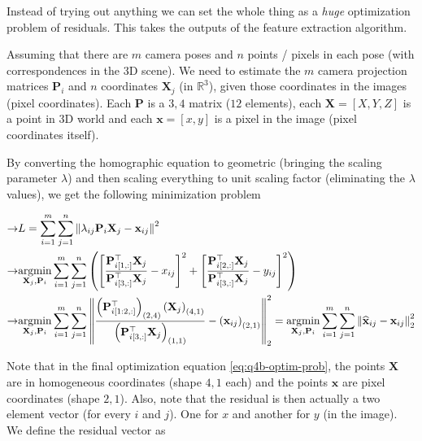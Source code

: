 Instead of trying out anything we can set the whole thing as a \textit{huge} optimization problem of residuals. This takes the outputs of the feature extraction algorithm.

Assuming that there are $m$ camera poses and $n$ points / pixels in each pose (with correspondences in the 3D scene). We need to estimate the $m$ camera projection matrices $\mathbf{P}_i$ and $n$ coordinates $\mathbf{X}_j$ (in $\mathbb{R}^3$), given those coordinates in the images (pixel coordinates). Each $\mathbf{P}$ is a $3, 4$ matrix ($12$ elements), each $\mathbf{X} = [X, Y, Z]$ is a point in 3D world and each $\mathbf{x} = [x, y]$ is a pixel in the image (pixel coordinates itself).

By converting the homographic equation to geometric (bringing the scaling parameter $\lambda$) and then scaling everything to unit scaling factor (eliminating the $\lambda$ values), we get the following minimization problem

\begin{align}
    \rightarrow& L = \sum_{i=1}^m \sum_{j=1}^{n} \left \| \lambda_{ij} \mathbf{P}_i \mathbf{X}_j - \mathbf{x}_{ij} \right \|^2
    \nonumber \\
    \rightarrow& \underset{\mathbf{X}_j, \mathbf{P}_i}{\textup{argmin}} \sum_{i=1}^{m} \sum_{j=1}^{n} \left ( \left [ \frac{ \mathbf{P}_{i[1, :]}^\top \mathbf{X}_j }{ \mathbf{P}_{i[3, :]}^\top \mathbf{X}_j } - x_{ij} \right ]^2 + \left [ \frac{ \mathbf{P}_{i[2, :]}^\top \mathbf{X}_j }{ \mathbf{P}_{i[3, :]}^\top \mathbf{X}_j } - y_{ij} \right ]^2 \right )
    \nonumber \\
    \rightarrow& \underset{\mathbf{X}_j, \mathbf{P}_i}{\textup{argmin}} \sum_{i=1}^{m} \sum_{j=1}^{n} \left \| \frac{ \left ( \mathbf{P}_{i[1:2, :]}^\top \right )_{(2,4)} \left ( \mathbf{X}_j \right )_{(4, 1)} }{ \left ( \mathbf{P}_{i[3, :]}^\top \mathbf{X}_j \right )_{(1,1)} } - \left ( \mathbf{x}_{ij} \right )_{(2, 1)} \right \|^2_2 = \underset{\mathbf{X}_j, \mathbf{P}_i}{\textup{argmin}} \sum_{i=1}^{m} \sum_{j=1}^{n} \left \| \widehat{\mathbf{x}}_{ij} - \mathbf{x}_{ij}  \right \|_2^2
    \label{eq:q4b-optim-prob}
\end{align}

Note that in the final optimization equation \ref{eq:q4b-optim-prob}, the points $\mathbf{X}$ are in homogeneous coordinates (shape $4, 1$ each) and the points $\mathbf{x}$ are pixel coordinates (shape $2, 1$). Also, note that the residual is then actually a two element vector (for every $i$ and $j$). One for $x$ and another for $y$ (in the image). We define the residual vector as

